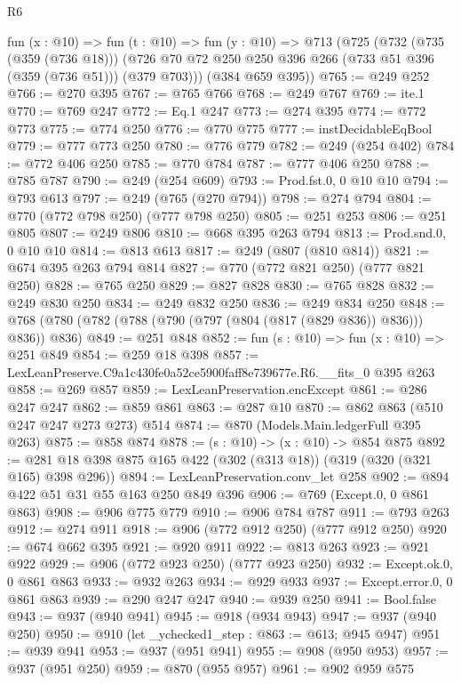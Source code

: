 \begin{lexlean}{R6}
\begin{coremodule}
  fun (x : @10) =>
  fun (t : @10) =>
  fun (y : @10) =>
  @713
    (@725
      (@732
        (@735 (@359 (@736 @18)))
        (@726 @70 @72 @250 @250 @396 @266 (@733 @51 @396 (@359 (@736 @51))) (@379 @703)))
      (@384 @659 @395))
@765 := @249 @252
@766 := @270 @395
@767 := @765 @766
@768 := @249 @767
@769 := ite.{1}
@770 := @769 @247
@772 := Eq.{1} @247
@773 := @274 @395
@774 := @772 @773
@775 := @774 @250
@776 := @770 @775
@777 := instDecidableEqBool
@779 := @777 @773 @250
@780 := @776 @779
@782 := @249 (@254 @402)
@784 := @772 @406 @250
@785 := @770 @784
@787 := @777 @406 @250
@788 := @785 @787
@790 := @249 (@254 @609)
@793 := Prod.fst.{0, 0} @10 @10
@794 := @793 @613
@797 := @249 (@765 (@270 @794))
@798 := @274 @794
@804 := @770 (@772 @798 @250) (@777 @798 @250)
@805 := @251 @253
@806 := @251 @805
@807 := @249 @806
@810 := @668 @395 @263 @794
@813 := Prod.snd.{0, 0} @10 @10
@814 := @813 @613
@817 := @249 (@807 (@810 @814))
@821 := @674 @395 @263 @794 @814
@827 := @770 (@772 @821 @250) (@777 @821 @250)
@828 := @765 @250
@829 := @827 @828
@830 := @765 @828
@832 := @249 @830 @250
@834 := @249 @832 @250
@836 := @249 @834 @250
@848 := @768 (@780 (@782 (@788 (@790 (@797 (@804 (@817 (@829 @836)) @836))) @836)) @836)
@849 := @251 @848
@852 := fun (s : @10) => fun (x : @10) => @251 @849
@854 := @259 @18 @398
@857 := LexLeanPreserve.C9a1c430fe0a52ce5900faff8e739677e.R6.__fits_0 @395 @263
@858 := @269 @857
@859 := LexLeanPreservation.encExcept
@861 := @286 @247 @247
@862 := @859 @861
@863 := @287 @10
@870 := @862 @863 (@510 @247 @247 @273 @273) @514
@874 := @870 (Models.Main.ledgerFull @395 @263)
@875 := @858 @874
@878 := (s : @10) -> (x : @10) -> @854 @875
@892 := @281 @18 @398 @875 @165 @422 (@302 (@313 @18)) (@319 (@320 (@321 @165) @398 @296))
@894 := LexLeanPreservation.conv_let @258
@902 := @894 @422 @51 @31 @55 @163 @250 @849 @396
@906 := @769 (Except.{0, 0} @861 @863)
@908 := @906 @775 @779
@910 := @906 @784 @787
@911 := @793 @263
@912 := @274 @911
@918 := @906 (@772 @912 @250) (@777 @912 @250)
@920 := @674 @662 @395
@921 := @920 @911
@922 := @813 @263
@923 := @921 @922
@929 := @906 (@772 @923 @250) (@777 @923 @250)
@932 := Except.ok.{0, 0} @861 @863
@933 := @932 @263
@934 := @929 @933
@937 := Except.error.{0, 0} @861 @863
@939 := @290 @247 @247
@940 := @939 @250
@941 := Bool.false
@943 := @937 (@940 @941)
@945 := @918 (@934 @943)
@947 := @937 (@940 @250)
@950 := @910 (let _ychecked1_step : @863 := @613; @945 @947)
@951 := @939 @941
@953 := @937 (@951 @941)
@955 := @908 (@950 @953)
@957 := @937 (@951 @250)
@959 := @870 (@955 @957)
@961 := @902 @959 @575

\end{coremodule}
\end{lexlean}
